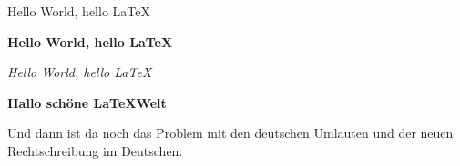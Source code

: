 \documentclass[12pt, a4paper]{article}
\begin{document}
Hello World, hello \LaTeX

\textbf{Hello World, hello \LaTeX}

\textit{Hello World, hello \LaTeX}

\textbf{Hallo schöne \LaTeX Welt}

Und dann ist da noch das Problem mit den deutschen Umlauten und der neuen Rechtschreibung im Deutschen.
\end{document}

